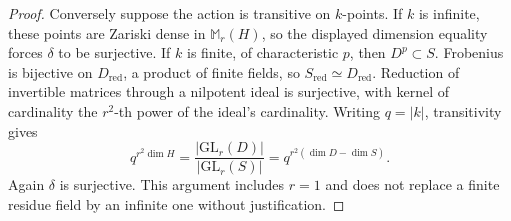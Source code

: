 \begin{proof}
Conversely suppose the action is transitive on $k$-points.  If $k$ is
infinite, these points are Zariski dense in $\mathbb M_r(H)$, so the
displayed dimension equality forces $\delta$ to be surjective.
If $k$ is finite, of characteristic $p$, then $D^p\subset S$.  Frobenius
is bijective on $D_{\mathrm{red}}$, a product of finite fields, so
$S_{\mathrm{red}}\simeq D_{\mathrm{red}}$.  Reduction of invertible
matrices through a nilpotent ideal is surjective, with kernel of
cardinality the $r^2$-th power of the ideal's cardinality.  Writing
$q=|k|$, transitivity gives
\[
 q^{r^2\dim H}
 =\frac{|\mathrm{GL}_r(D)|}{|\mathrm{GL}_r(S)|}
 =q^{r^2(\dim D-\dim S)}.
\]
Again $\delta$ is surjective.  This argument includes $r=1$ and does not
replace a finite residue field by an infinite one without justification.
\end{proof}

